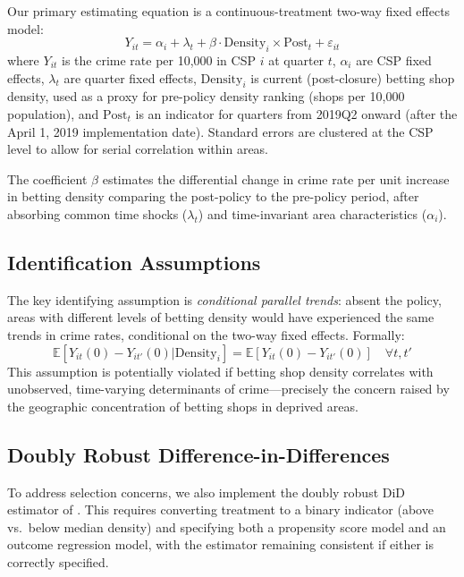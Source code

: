 \documentclass[12pt]{article}
\newcommand{\E}{\mathbb{E}}
\begin{document}
Our primary estimating equation is a continuous-treatment two-way fixed effects model:
\begin{equation}
Y_{it} = \alpha_i + \lambda_t + \beta \cdot \text{Density}_i \times \text{Post}_t + \varepsilon_{it}
\label{eq:main}
\end{equation}
where $Y_{it}$ is the crime rate per 10,000 in CSP $i$ at quarter $t$, $\alpha_i$ are CSP fixed effects, $\lambda_t$ are quarter fixed effects, $\text{Density}_i$ is current (post-closure) betting shop density, used as a proxy for pre-policy density ranking (shops per 10,000 population), and $\text{Post}_t$ is an indicator for quarters from 2019Q2 onward (after the April 1, 2019 implementation date). Standard errors are clustered at the CSP level to allow for serial correlation within areas.

The coefficient $\beta$ estimates the differential change in crime rate per unit increase in betting density comparing the post-policy to the pre-policy period, after absorbing common time shocks ($\lambda_t$) and time-invariant area characteristics ($\alpha_i$).

\subsection{Identification Assumptions}

The key identifying assumption is \textit{conditional parallel trends}: absent the policy, areas with different levels of betting density would have experienced the same trends in crime rates, conditional on the two-way fixed effects. Formally:
\begin{equation}
\E[Y_{it}(0) - Y_{it'}(0) | \text{Density}_i] = \E[Y_{it}(0) - Y_{it'}(0)]  \quad \forall t, t'
\end{equation}
This assumption is potentially violated if betting shop density correlates with unobserved, time-varying determinants of crime---precisely the concern raised by the geographic concentration of betting shops in deprived areas.

\subsection{Doubly Robust Difference-in-Differences}

To address selection concerns, we also implement the doubly robust DiD estimator of \citet{santanna2020}. This requires converting treatment to a binary indicator (above vs.\ below median density) and specifying both a propensity score model and an outcome regression model, with the estimator remaining consistent if either is correctly specified.
\end{document}
